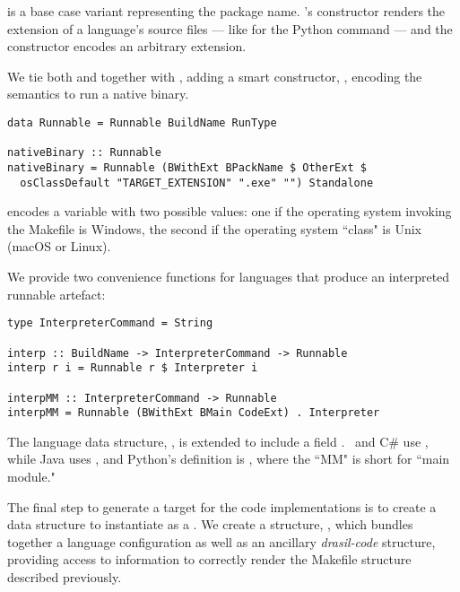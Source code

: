 {{{{{ is a base case variant representing the package name. 's  constructor renders the extension of a language's source files --- like for the Python  command --- and the  constructor encodes an arbitrary extension.

We tie both  and  together with , adding a smart constructor, , encoding the semantics to run a native binary.

\begin{tcolorbox}
\begin{verbatim}
data Runnable = Runnable BuildName RunType

nativeBinary :: Runnable
nativeBinary = Runnable (BWithExt BPackName $ OtherExt $
  osClassDefault "TARGET_EXTENSION" ".exe" "") Standalone
\end{verbatim}
\end{tcolorbox}

 encodes a variable with two possible values: one if the operating system invoking the Makefile is Windows, the second if the operating system ``class" is Unix (macOS or Linux).

We provide two convenience functions for languages that produce an interpreted runnable artefact:

\begin{tcolorbox}
\begin{verbatim}
type InterpreterCommand = String

interp :: BuildName -> InterpreterCommand -> Runnable
interp r i = Runnable r $ Interpreter i

interpMM :: InterpreterCommand -> Runnable
interpMM = Runnable (BWithExt BMain CodeExt) . Interpreter
\end{verbatim}
\end{tcolorbox}

The language data structure, , is extended to include a field \linebreak{}. \CC~and C\# use , while Java uses , and Python's  definition is \linebreak{}, where the ``MM" is short for ``main module."

The final step to generate a  target for the code implementations is to create a data structure to instantiate as a . We create a structure, , which bundles together a language configuration as well as an ancillary \textit{drasil-code} structure, providing access to information to correctly render the Makefile structure described previously.

}}}}}
